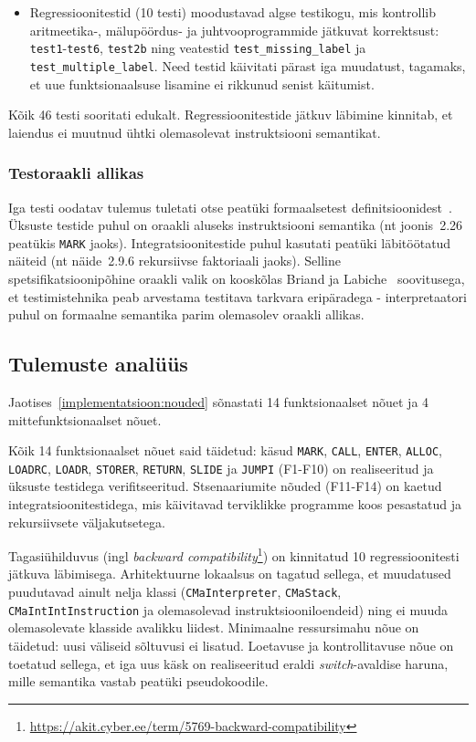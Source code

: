 \begin{itemize}
	\item {Regressioonitestid (10 testi)} moodustavad algse testikogu, mis kontrollib aritmeetika-, mälupöördus- ja juhtvooprogrammide jätkuvat korrektsust: \texttt{test1}-\texttt{test6}, \texttt{test2b} ning veatestid \texttt{test\_missing\_label} ja \texttt{test\_multiple\_label}. Need testid käivitati pärast iga muudatust, tagamaks, et uue funktsionaalsuse lisamine ei rikkunud senist käitumist.
\end{itemize}

Kõik 46 testi sooritati edukalt. Regressioonitestide jätkuv läbimine kinnitab, et laiendus ei muutnud ühtki olemasolevat instruktsiooni semantikat.

\subsubsection{Testoraakli allikas}

Iga testi oodatav tulemus tuletati otse peatüki formaalsetest definitsioonidest~\cite{wilhelm_imperative_2010}. Üksuste testide puhul on oraakli aluseks instruktsiooni semantika (nt joonis~2.26 peatükis \texttt{MARK} jaoks). Integratsioonitestide puhul kasutati peatüki läbitöötatud näiteid (nt näide~2.9.6 rekursiivse faktoriaali jaoks). Selline spetsifikatsioonipõhine oraakli valik on kooskõlas Briand ja Labiche~\cite{briand_empirical_2004} soovitusega, et testimistehnika peab arvestama testitava tarkvara eripäradega - interpretaatori puhul on formaalne semantika parim olemasolev oraakli allikas.

\subsection{Tulemuste analüüs}\label{tulemused:analuus}

Jaotises~\ref{implementatsioon:nouded} sõnastati 14 funktsionaalset nõuet ja 4 mittefunktsionaalset nõuet.

Kõik 14 funktsionaalset nõuet said täidetud: käsud \texttt{MARK}, \texttt{CALL}, \texttt{ENTER}, \texttt{ALLOC}, \texttt{LOADRC}, \texttt{LOADR}, \texttt{STORER}, \texttt{RETURN}, \texttt{SLIDE} ja \texttt{JUMPI} (F1-F10) on realiseeritud ja üksuste testidega verifitseeritud. Stsenaariumite nõuded (F11-F14) on kaetud integratsioonitestidega, mis käivitavad terviklikke programme koos pesastatud ja rekursiivsete väljakutsetega.

Tagasiühilduvus (ingl \emph{backward compatibility}\footnote{\url{https://akit.cyber.ee/term/5769-backward-compatibility}}) on kinnitatud 10 regressioonitesti jätkuva läbimisega. Arhitektuurne lokaalsus on tagatud sellega, et muudatused puudutavad ainult nelja klassi (\texttt{CMaInterpreter}, \texttt{CMaStack}, \texttt{CMaIntIntInstruction} ja olemasolevad instruktsiooniloendeid) ning ei muuda olemasolevate klasside avalikku liidest. Minimaalne ressursimahu nõue on täidetud: uusi väliseid sõltuvusi ei lisatud. Loetavuse ja kontrollitavuse nõue on toetatud sellega, et iga uus käsk on realiseeritud eraldi \emph{switch}-avaldise haruna, mille semantika vastab peatüki pseudokoodile.

